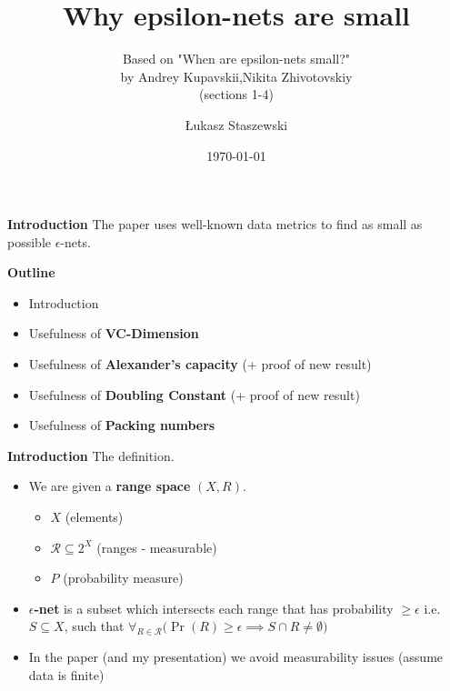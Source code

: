 \documentclass{beamer}
\title[Short Title]{Why epsilon-nets are small}
\subtitle{Based on  "When are epsilon-nets small?" \\by
Andrey Kupavskii,Nikita Zhivotovskiy\\ (sections 1-4) }
\author[Łukasz Staszewski]{Łukasz Staszewski}
\institute[Your Institute]{MIM UW}
\date{\today}
\begin{document}
\begin{frame}
  \titlepage
\end{frame}

\begin{frame}{\textbf{Introduction}}
The paper uses well-known data metrics to find as small as possible $\epsilon$-nets.
\end{frame}

\begin{frame}{\textbf{Outline}}
  \begin{itemize}
      \item Introduction
      \item Usefulness of \textbf{VC-Dimension}
      \item Usefulness of \textbf{Alexander's capacity}  (+ proof of new result)
      \item Usefulness of \textbf{Doubling Constant}  (+ proof of new result)
      \item Usefulness of \textbf{Packing numbers}
  \end{itemize}
\end{frame}

\begin{frame}{\textbf{Introduction}}
The definition.
  \begin{itemize}
    \item We are given a \textbf{range space} \( (X,R) \). 
    \begin{itemize}
        \item \(X\) \hspace{0.9cm} (elements)
        \item \(\mathcal{R} \subseteq 2^X\) \hspace{0.035cm} (ranges - measurable)
        \item \(P\) \hspace{0.9cm} (probability measure)
    \end{itemize}
    \vspace{0.5cm}
    \item \textbf{$\epsilon$-net} is a subset which intersects each range that has probability $\geq \epsilon$
    i.e.\\
    $S \subseteq X$, such that \(\forall_{R \in \mathcal{R}}\bigl(\Pr(R) \geq \epsilon \implies S \cap R \neq \emptyset \bigr)\)
    \vspace{0.5cm}
    \item In the paper (and my presentation) we avoid measurability issues (assume data is finite)
  \end{itemize}
\end{frame}
\end{document}
